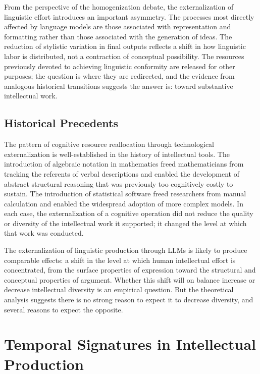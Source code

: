 \documentclass[12pt,a4paper]{article}
\theoremstyle{definition}
\theoremstyle{plain}
\theoremstyle{remark}
\begin{document}
From the perspective of the homogenization debate, the externalization of linguistic effort
introduces an important asymmetry. The processes most directly affected by language models
are those associated with representation and formatting rather than those associated with the
generation of ideas. The reduction of stylistic variation in final outputs reflects a shift
in how linguistic labor is distributed, not a contraction of conceptual possibility. The
resources previously devoted to achieving linguistic conformity are released for other
purposes; the question is where they are redirected, and the evidence from analogous
historical transitions suggests the answer is: toward substantive intellectual work.

\subsection{Historical Precedents}

The pattern of cognitive resource reallocation through technological externalization is
well-established in the history of intellectual tools. The introduction of algebraic notation
in mathematics freed mathematicians from tracking the referents of verbal descriptions and
enabled the development of abstract structural reasoning that was previously too cognitively
costly to sustain. The introduction of statistical software freed researchers from manual
calculation and enabled the widespread adoption of more complex models. In each case, the
externalization of a cognitive operation did not reduce the quality or diversity of the
intellectual work it supported; it changed the level at which that work was conducted.

The externalization of linguistic production through LLMs is likely to produce comparable
effects: a shift in the level at which human intellectual effort is concentrated, from the
surface properties of expression toward the structural and conceptual properties of argument.
Whether this shift will on balance increase or decrease intellectual diversity is an
empirical question. But the theoretical analysis suggests there is no strong reason to
expect it to decrease diversity, and several reasons to expect the opposite.

\section{Temporal Signatures in Intellectual Production}
\label{sec:temporal}
\end{document}
